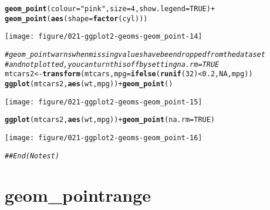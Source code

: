 \documentclass[a4paper,titlepage]{tufte-handout}\usepackage[]{graphicx}\usepackage[]{color}
\makeatletter
\def\maxwidth{ %
  \ifdim\Gin@nat@width>\linewidth
    \linewidth
  \else
    \Gin@nat@width
  \fi
}
\newcommand{\hlnum}[1]{\textcolor[rgb]{0.686,0.059,0.569}{#1}}%
\newcommand{\hlstr}[1]{\textcolor[rgb]{0.192,0.494,0.8}{#1}}%
\newcommand{\hlcom}[1]{\textcolor[rgb]{0.678,0.584,0.686}{\textit{#1}}}%
\newcommand{\hlopt}[1]{\textcolor[rgb]{0,0,0}{#1}}%
\newcommand{\hlstd}[1]{\textcolor[rgb]{0.345,0.345,0.345}{#1}}%
\newcommand{\hlkwb}[1]{\textcolor[rgb]{0.69,0.353,0.396}{#1}}%
\newcommand{\hlkwc}[1]{\textcolor[rgb]{0.333,0.667,0.333}{#1}}%
\newcommand{\hlkwd}[1]{\textcolor[rgb]{0.737,0.353,0.396}{\textbf{#1}}}%
\newenvironment{kframe}{%
 \def\at@end@of@kframe{}%
 \ifinner\ifhmode%
  \def\at@end@of@kframe{\end{minipage}}%
  \begin{minipage}{\columnwidth}%
 \fi\fi%
 \def\FrameCommand##1{\hskip\@totalleftmargin \hskip-\fboxsep
 \colorbox{shadecolor}{##1}\hskip-\fboxsep
     \hskip-\linewidth \hskip-\@totalleftmargin \hskip\columnwidth}%
 \MakeFramed {\advance\hsize-\width
   \@totalleftmargin\z@ \linewidth\hsize
   \@setminipage}}%
 {\par\unskip\endMakeFramed%
 \at@end@of@kframe}
\newenvironment{knitrout}{}{} %
\makeatother
\begin{document}
\begin{knitrout}
\begin{kframe}
\begin{alltt}
  \hlkwd{geom_point}\hlstd{(}\hlkwc{colour} \hlstd{=} \hlstr{"pink"}\hlstd{,} \hlkwc{size} \hlstd{=} \hlnum{4}\hlstd{,} \hlkwc{show.legend} \hlstd{=} \hlnum{TRUE}\hlstd{)} \hlopt{+}
  \hlkwd{geom_point}\hlstd{(}\hlkwd{aes}\hlstd{(}\hlkwc{shape} \hlstd{=} \hlkwd{factor}\hlstd{(cyl)))}
\end{alltt}
\end{kframe}
\texttt{[image: figure/021-ggplot2-geoms-geom\_point-14]} 
\begin{kframe}\begin{alltt}
\hlcom{# geom_point warns when missing values have been dropped from the data set}
\hlcom{# and not plotted, you can turn this off by setting na.rm = TRUE}
\hlstd{mtcars2} \hlkwb{<-} \hlkwd{transform}\hlstd{(mtcars,} \hlkwc{mpg} \hlstd{=} \hlkwd{ifelse}\hlstd{(}\hlkwd{runif}\hlstd{(}\hlnum{32}\hlstd{)} \hlopt{<} \hlnum{0.2}\hlstd{,} \hlnum{NA}\hlstd{, mpg))}
\hlkwd{ggplot}\hlstd{(mtcars2,} \hlkwd{aes}\hlstd{(wt, mpg))} \hlopt{+} \hlkwd{geom_point}\hlstd{()}
\end{alltt}


{\ttfamily\noindent\color{warningcolor}{\#\# Warning: Removed 6 rows containing missing values (geom\_point).}}\end{kframe}
\texttt{[image: figure/021-ggplot2-geoms-geom\_point-15]} 
\begin{kframe}\begin{alltt}
\hlkwd{ggplot}\hlstd{(mtcars2,} \hlkwd{aes}\hlstd{(wt, mpg))} \hlopt{+} \hlkwd{geom_point}\hlstd{(}\hlkwc{na.rm} \hlstd{=} \hlnum{TRUE}\hlstd{)}
\end{alltt}
\end{kframe}
\texttt{[image: figure/021-ggplot2-geoms-geom\_point-16]} 
\begin{kframe}\begin{alltt}
\hlcom{## End(No test)}
\end{alltt}
\end{kframe}
\end{knitrout}


\section{geom\_pointrange}
\end{document}
